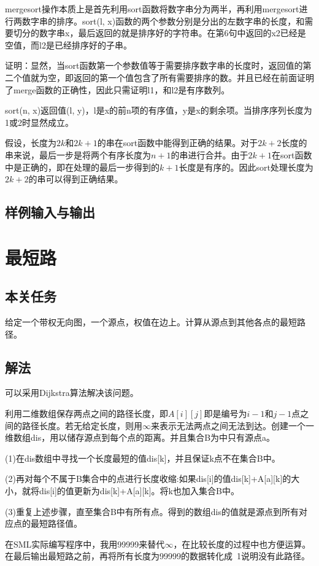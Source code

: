 \documentclass[UTF8,a4paperdui, %
]{ctexart}
\begin{document}
mergesort操作本质上是首先利用sort函数将数字串分为两半，再利用mergesort进行两数字串的排序。sort(l, x)函数的两个参数分别是分出的左数字串的长度，和需要切分的数字串x，最后返回的就是排序好的字符串。在第6句中返回的x2已经是空值，而l2是已经排序好的子串。

证明：显然，当sort函数第一个参数值等于需要排序数字串的长度时，返回值的第二个值就为空，即返回的第一个值包含了所有需要排序的数。并且已经在前面证明了merge函数的正确性，因此只需证明l1，和l2是有序数列。

sort(n, x)返回值(l, y)，l是x的前n项的有序值，y是x的剩余项。当排序序列长度为1或2时显然成立。

假设，长度为$2k$和$2k+1$的串在sort函数中能得到正确的结果。对于$2k+2$长度的串来说，最后一步是将两个有序长度为$n+1$的串进行合并。由于$2k+1$在sort函数中是正确的，即在处理的最后一步得到的$k+1$长度是有序的。因此sort处理长度为$2k+2$的串可以得到正确结果。




\subsection{样例输入与输出}
\section{最短路}
\subsection{本关任务}
给定一个带权无向图，一个源点，权值在边上。计算从源点到其他各点的最短路径。
\subsection{解法}
可以采用Dijkstra算法解决该问题。

利用二维数组保存两点之间的路径长度，即$A[i][j]$即是编号为$i-1$和$j-1$点之间的路径长度。若无给定长度，则用$\infty$来表示无法两点之间无法到达。创建一个一维数组dis，用以储存源点到每个点的距离。并且集合B为中只有源点a。

(1)在dis数组中寻找一个长度最短的值dis[k]，并且保证k点不在集合B中。

(2)再对每个不属于B集合中的点进行长度收缩:如果dis[i]的值dis[k]+A[a][k]的大小，就将dis[i]的值更新为dis[k]+A[a][k]。将k也加入集合B中。

(3)重复上述步骤，直至集合B中有所有点。得到的数组dis的值就是源点到所有对应点的最短路径值。

在SML实际编写程序中，我用99999来替代$\infty$，在比较长度的过程中也方便运算。在最后输出最短路之前，再将所有长度为99999的数据转化成~1说明没有此路径。
\end{document}

